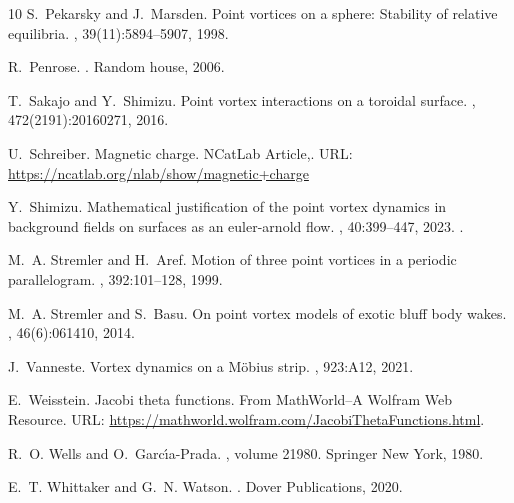 \documentclass[11pt,twoside]{article}
\theoremstyle{definition}
\numberwithin{equation}{section}
\begin{document}
\begin{thebibliography}{10}
S.~Pekarsky and J.~Marsden.
\newblock Point vortices on a sphere: Stability of relative equilibria.
, 39(11):5894--5907, 1998.

R.~Penrose.
.
\newblock Random house, 2006.

T.~Sakajo and Y.~Shimizu.
\newblock Point vortex interactions on a toroidal surface.
, 472(2191):20160271, 2016.

U.~Schreiber.
\newblock Magnetic charge.
\newblock NCatLab Article,.
\newblock URL: \url{https://ncatlab.org/nlab/show/magnetic+charge} %

Y.~Shimizu.
\newblock Mathematical justification of the point vortex dynamics in background fields on surfaces as an euler-arnold flow.
, 40:399--447, 2023.
\newblock \href {https://doi.org/10.1007/s13160-022-00529-8} {}.

M.~A. Stremler and H.~Aref.
\newblock Motion of three point vortices in a periodic parallelogram.
, 392:101--128, 1999.

M.~A. Stremler and S.~Basu.
\newblock On point vortex models of exotic bluff body wakes.
, 46(6):061410, 2014.

J.~Vanneste.
\newblock Vortex dynamics on a {M}{\"o}bius strip.
, 923:A12, 2021.

E.~Weisstein.
\newblock Jacobi theta functions.
\newblock From MathWorld--A Wolfram Web Resource.
\newblock URL: \url{https://mathworld.wolfram.com/JacobiThetaFunctions.html}.

R.~O. Wells and O.~Garc{\'\i}a-Prada.
, volume 21980.
\newblock Springer New York, 1980.

E.~T. Whittaker and G.~N. Watson.
.
\newblock Dover Publications, 2020.


\end{thebibliography}
\end{document}
